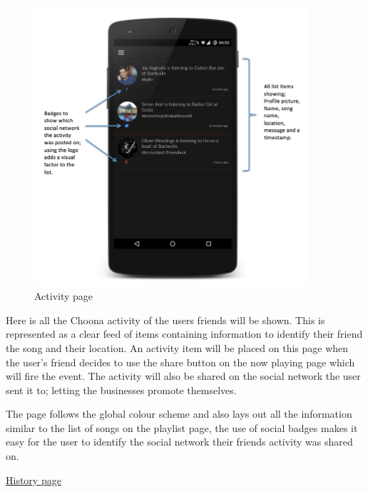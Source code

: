 \noindent
\begin{figure}[h!]
\centering
\includegraphics[width=0.9\textwidth]{./img/activityannotated.png}
\caption{Activity page}
\label{fig:activitypage}
\end{figure}

Here is all the Choona activity of the users friends will be shown. This is represented as a clear feed of items containing information to identify their friend the song and their location. An activity item will be placed on this page when the user's friend decides to use the share button on the now playing page which will fire the event. The activity will also be shared on the social network the user sent it to; letting the businesses promote themselves. 

The page follows the global colour scheme and also lays out all the information similar to the list of songs on the playlist page, the use of social badges makes it easy for the user to identify the social network their friends activity was shared on. 
\newpage

\noindent\underline{History page}\newline

